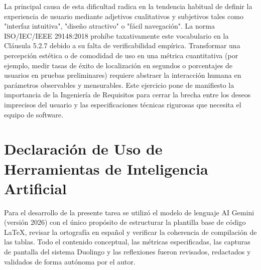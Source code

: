 \documentclass[11pt, a4paper]{article}
\begin{document}
La principal causa de esta dificultad radica en la tendencia habitual de definir la experiencia de usuario mediante adjetivos cualitativos y subjetivos tales como "interfaz intuitiva", "diseño atractivo" o "fácil navegación". La norma ISO/IEC/IEEE 29148:2018 prohíbe taxativamente este vocabulario en la Cláusula 5.2.7 debido a su falta de verificabilidad empírica. Transformar una percepción estética o de comodidad de uso en una métrica cuantitativa (por ejemplo, medir tasas de éxito de localización en segundos o porcentajes de usuarios en pruebas preliminares) requiere abstraer la interacción humana en parámetros observables y mensurables. Este ejercicio pone de manifiesto la importancia de la Ingeniería de Requisitos para cerrar la brecha entre los deseos imprecisos del usuario y las especificaciones técnicas rigurosas que necesita el equipo de software.

\section*{Declaración de Uso de Herramientas de Inteligencia Artificial}
Para el desarrollo de la presente tarea se utilizó el modelo de lenguaje AI Gemini (versión 2026) con el único propósito de estructurar la plantilla base de código LaTeX, revisar la ortografía en español y verificar la coherencia de compilación de las tablas. Todo el contenido conceptual, las métricas especificadas, las capturas de pantalla del sistema Duolingo y las reflexiones fueron revisados, redactados y validados de forma autónoma por el autor.




\end{document}
